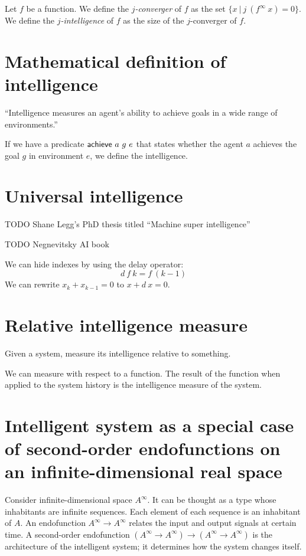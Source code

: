 Let \(f\) be a function.
We define the \emph{\(j\)-converger} of \(f\)
as the set \( \{ x ~|~ j~(f^\infty~x) = 0 \} \).
We define the \emph{\(j\)-intelligence} of \(f\)
as the size of the \(j\)-converger of \(f\).

\section{Mathematical definition of intelligence}

``Intelligence measures an agent's ability to achieve goals in a wide range
of environments.''
\cite{LeggPhd,LeggHutterFormal}

If we have a predicate \(\textsf{achieve}~a~g~e\) that states whether the agent \(a\) achieves the goal \(g\) in environment \(e\),
we define the intelligence.

\section{Universal intelligence}

TODO Shane Legg's PhD thesis titled ``Machine super intelligence'' \cite{LeggPhd}

TODO Negnevitsky AI book \cite{negnevitsky2005artificial}

We can hide indexes by using the delay operator:
\[
    d~f~k = f~(k-1)
\]
We can rewrite
\( x_k + x_{k-1} = 0 \)
to
\(x + d~x = 0\).

\section{Relative intelligence measure}

Given a system, measure its intelligence relative to something.

We can measure with respect to a function.
The result of the function when applied to the system history
is the intelligence measure of the system.

\section{Intelligent system as a special case of second-order endofunctions on an infinite-dimensional real space}

Consider infinite-dimensional space \(A^\infty\).
It can be thought as a type whose inhabitants are infinite sequences.
Each element of each sequence is an inhabitant of \(A\).
An endofunction \(A^\infty \to A^\infty\) relates the input and output signals at certain time.
A second-order endofunction \((A^\infty \to A^\infty) \to (A^\infty \to A^\infty)\) is the architecture of the intelligent system;
it determines how the system changes itself.

